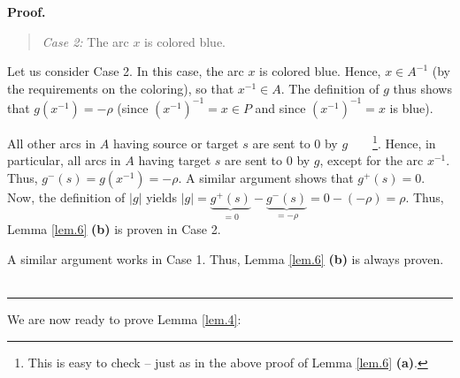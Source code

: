 \documentclass[numbers=enddot,12pt,final,onecolumn,notitlepage]{scrartcl}%
\theoremstyle{definition}
\newenvironment{statement}{\begin{quote}}{\end{quote}}
\newenvironment{proof}[1][Proof]{\noindent\textbf{#1.} }{\ \rule{0.5em}{0.5em}}
\begin{document}
\begin{proof}
\begin{statement}
\textit{Case 2:} The arc $x$ is colored blue.
\end{statement}

Let us consider Case 2. In this case, the arc $x$ is colored blue. Hence,
$x\in A^{-1}$ (by the requirements on the coloring), so that $x^{-1}\in A$.
The definition of $g$ thus shows that $g\left(  x^{-1}\right)  =-\rho$ (since
$\left(  x^{-1}\right)  ^{-1}=x\in P$ and since $\left(  x^{-1}\right)
^{-1}=x$ is blue).

All other arcs in $A$ having source or target $s$ are sent to $0$ by
$g$\ \ \ \ \footnote{This is easy to check -- just as in the above proof of
Lemma \ref{lem.6} \textbf{(a)}.}. Hence, in particular, all arcs in $A$ having
target $s$ are sent to $0$ by $g$, except for the arc $x^{-1}$. Thus,
$g^{-}\left(  s\right)  =g\left(  x^{-1}\right)  =-\rho$. A similar argument
shows that $g^{+}\left(  s\right)  =0$. Now, the definition of $\left\vert
g\right\vert $ yields $\left\vert g\right\vert =\underbrace{g^{+}\left(
s\right)  }_{=0}-\underbrace{g^{-}\left(  s\right)  }_{=-\rho}=0-\left(
-\rho\right)  =\rho$. Thus, Lemma \ref{lem.6} \textbf{(b)} is proven in Case 2.

A similar argument works in Case 1. Thus, Lemma \ref{lem.6} \textbf{(b)} is
always proven.
\end{proof}

We are now ready to prove Lemma \ref{lem.4}:
\end{document}
